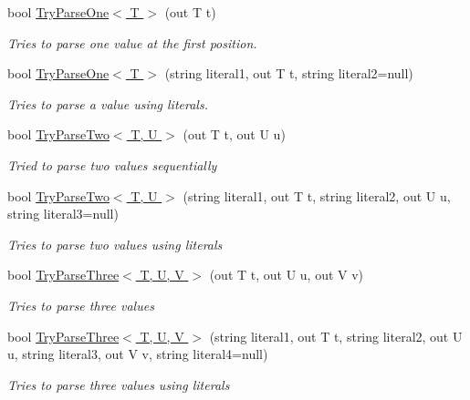 \begin{DoxyCompactItemize}
bool \hyperlink{class_o_t_a_1_1_command_1_1_argument_list_ac78980822abc28bc721d73d4b7281f35}{Try\+Parse\+One$<$ T $>$} (out T t)
\begin{DoxyCompactList}\small\item\em Tries to parse one value at the first position. \end{DoxyCompactList}\item 
bool \hyperlink{class_o_t_a_1_1_command_1_1_argument_list_ad0bcb24ef37104fb49d997cd9f03bb3f}{Try\+Parse\+One$<$ T $>$} (string literal1, out T t, string literal2=null)
\begin{DoxyCompactList}\small\item\em Tries to parse a value using literals. \end{DoxyCompactList}\item 
bool \hyperlink{class_o_t_a_1_1_command_1_1_argument_list_a5240c9725b2e0388dbec42c4f6351eda}{Try\+Parse\+Two$<$ T, U $>$} (out T t, out U u)
\begin{DoxyCompactList}\small\item\em Tried to parse two values sequentially \end{DoxyCompactList}\item 
bool \hyperlink{class_o_t_a_1_1_command_1_1_argument_list_a23e590257bb36fe3a517e26012ead9fa}{Try\+Parse\+Two$<$ T, U $>$} (string literal1, out T t, string literal2, out U u, string literal3=null)
\begin{DoxyCompactList}\small\item\em Tries to parse two values using literals \end{DoxyCompactList}\item 
bool \hyperlink{class_o_t_a_1_1_command_1_1_argument_list_a8e2bf6c142a3dccb6007bd6d32a208eb}{Try\+Parse\+Three$<$ T, U, V $>$} (out T t, out U u, out V v)
\begin{DoxyCompactList}\small\item\em Tries to parse three values \end{DoxyCompactList}\item 
bool \hyperlink{class_o_t_a_1_1_command_1_1_argument_list_aa67ea4115f72e0a7fa7841f296514e95}{Try\+Parse\+Three$<$ T, U, V $>$} (string literal1, out T t, string literal2, out U u, string literal3, out V v, string literal4=null)
\begin{DoxyCompactList}\small\item\em Tries to parse three values using literals \end{DoxyCompactList}\item 

\end{DoxyCompactItemize}
